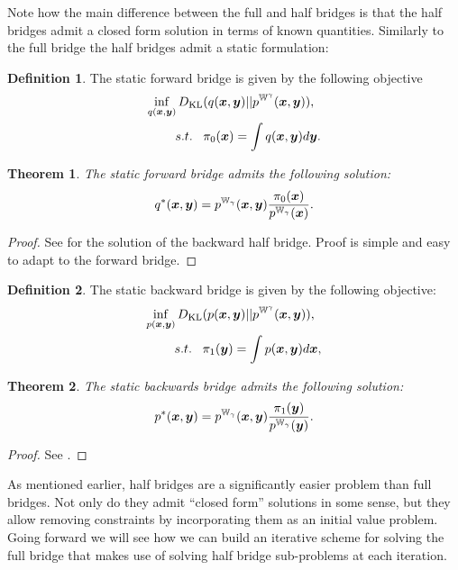 \documentclass[a4paper,12pt,twoside,openright]{report}
\newtheorem{theorem}{Theorem}
\theoremstyle{definition}
\newtheorem{definition}{Definition}[section]
\begin{document}
Note how the main difference between the full and half bridges is that the half bridges admit a closed form solution in terms of known quantities. Similarly to the full bridge the half bridges admit a static formulation:

\begin{definition}
The static forward bridge is given by the following objective
 \begin{align}\label{eq:static_bridge_forward}
        \inf_{q({\bm{x}},{\bm{y}})} D_{\mathrm{KL}}  &(q({\bm{x}},{\bm{y}}) || p^{\mathbb{W}^{\gamma}}({\bm{x}},{\bm{y}})), \nonumber \\
        s.t. \;\;\;& \pi_0({\bm{x}}) = \int q({\bm{x}},{\bm{y}}) d{\bm{y}}.
\end{align}
\end{definition}
\begin{theorem}\label{thrm:static_half_forward}
     The static forward bridge admits the following solution:
     \begin{align}
         q^{*}({\bm{x}},{\bm{y}}) = p^{\mathbb{W}_{\gamma}}({\bm{x}}, {\bm{y}})\frac{\pi_0({\bm{x}})}{p^{\mathbb{W}_{\gamma}}({\bm{x}})}.
     \end{align}
\end{theorem}
\begin{proof}
See \cite{pavon2018data} for the solution of the backward half bridge. Proof is simple and easy to adapt to the forward bridge. 
\end{proof}
\begin{definition}
The static backward bridge is given by the following objective:
 \begin{align}\label{eq:static_bridge_backward}
        \inf_{p({\bm{x}},{\bm{y}})} D_{\mathrm{KL}}  &(p({\bm{x}},{\bm{y}}) || p^{\mathbb{W}^{\gamma}}({\bm{x}},{\bm{y}})), \nonumber \\
        s.t. \;\;\;& \pi_1({\bm{y}}) = \int p({\bm{x}},{\bm{y}}) d{\bm{x}}, 
\end{align}
\end{definition}
\begin{theorem}\label{thrm:static_half_backward}
     The static backwards bridge admits the following solution:
     \begin{align}
         p^{*}({\bm{x}},{\bm{y}}) = p^{\mathbb{W}_{\gamma}}({\bm{x}}, {\bm{y}})\frac{\pi_1({\bm{y}})}{p^{\mathbb{W}_{\gamma}}({\bm{y}})}.
     \end{align}
\end{theorem}
\begin{proof}
See \cite{pavon2018data}.
\end{proof}

As mentioned earlier, half bridges are a significantly easier problem than full bridges. Not only do they admit ``closed form'' solutions in some sense, but they allow removing constraints by incorporating them as an initial value problem. Going forward we will see how we can build an iterative scheme for solving the full bridge that makes use of solving half bridge sub-problems at each iteration.
\end{document}
